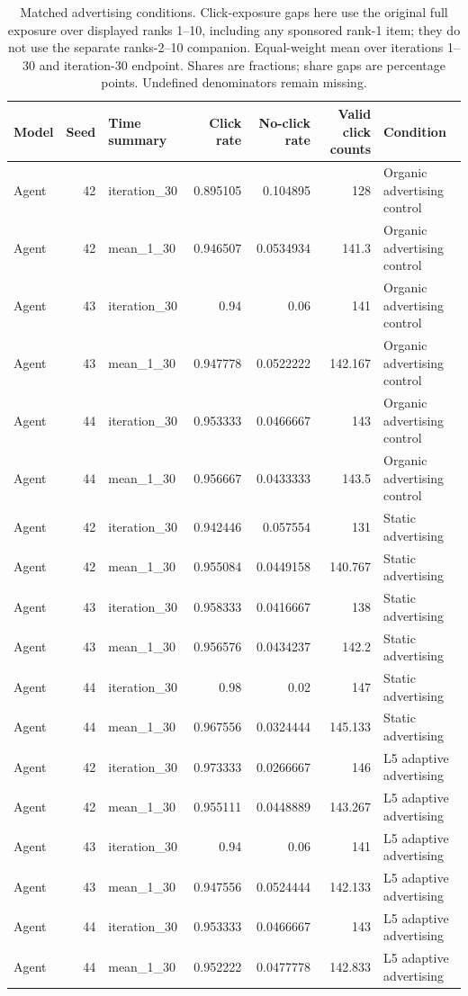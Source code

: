 \begin{table}[htbp!]
\centering
\small
\setlength{\tabcolsep}{3pt}
\renewcommand{\arraystretch}{1.1}
\begin{tabular}{lrlrrrl}
\hline
Model & Seed & Time summary & Click rate & No-click rate & Valid click counts & Condition \\
\hline
Agent & 42 & iteration\_30 & 0.895105 & 0.104895 & 128 & Organic advertising control \\
Agent & 42 & mean\_1\_30 & 0.946507 & 0.0534934 & 141.3 & Organic advertising control \\
Agent & 43 & iteration\_30 & 0.94 & 0.06 & 141 & Organic advertising control \\
Agent & 43 & mean\_1\_30 & 0.947778 & 0.0522222 & 142.167 & Organic advertising control \\
Agent & 44 & iteration\_30 & 0.953333 & 0.0466667 & 143 & Organic advertising control \\
Agent & 44 & mean\_1\_30 & 0.956667 & 0.0433333 & 143.5 & Organic advertising control \\
Agent & 42 & iteration\_30 & 0.942446 & 0.057554 & 131 & Static advertising \\
Agent & 42 & mean\_1\_30 & 0.955084 & 0.0449158 & 140.767 & Static advertising \\
Agent & 43 & iteration\_30 & 0.958333 & 0.0416667 & 138 & Static advertising \\
Agent & 43 & mean\_1\_30 & 0.956576 & 0.0434237 & 142.2 & Static advertising \\
Agent & 44 & iteration\_30 & 0.98 & 0.02 & 147 & Static advertising \\
Agent & 44 & mean\_1\_30 & 0.967556 & 0.0324444 & 145.133 & Static advertising \\
Agent & 42 & iteration\_30 & 0.973333 & 0.0266667 & 146 & L5 adaptive advertising \\
Agent & 42 & mean\_1\_30 & 0.955111 & 0.0448889 & 143.267 & L5 adaptive advertising \\
Agent & 43 & iteration\_30 & 0.94 & 0.06 & 141 & L5 adaptive advertising \\
Agent & 43 & mean\_1\_30 & 0.947556 & 0.0524444 & 142.133 & L5 adaptive advertising \\
Agent & 44 & iteration\_30 & 0.953333 & 0.0466667 & 143 & L5 adaptive advertising \\
Agent & 44 & mean\_1\_30 & 0.952222 & 0.0477778 & 142.833 & L5 adaptive advertising \\
\hline
\end{tabular}
\caption{Matched advertising conditions. Click-exposure gaps here use the original full exposure over displayed ranks 1--10, including any sponsored rank-1 item; they do not use the separate ranks-2--10 companion. Equal-weight mean over iterations 1--30 and iteration-30 endpoint. Shares are fractions; share gaps are percentage points. Undefined denominators remain missing.}
\label{chap:results:tab:rq1_advertising_click_behaviour}
\end{table}
